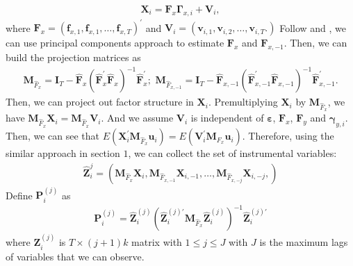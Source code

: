 \documentclass[12pt,a4paper,hyperref]{article}
\begin{document}
\begin{align}
\boldsymbol{X}_{i}=\boldsymbol{F}_{x}\boldsymbol{\Gamma}_{x,i}+\boldsymbol{V}_{i},
\end{align}
where $\boldsymbol{F}_{x}=\left( \boldsymbol{f}_{x,1}, \boldsymbol{f}_{x,1},\ldots,\boldsymbol{f}_{x,T} \right)^{'}$ and $\boldsymbol{V}_{i}=\left( \boldsymbol{v}_{i,1}, \boldsymbol{v}_{i,2},\ldots,\boldsymbol{v}_{i,T}.  \right)$
Follow \citet{bai:2003} and \citet{bai:2009}, we can use principal components approach to estimate $\boldsymbol{F}_{x}$ and $\boldsymbol{F}_{x,-1}$. Then, we can build the projection matrices as
\begin{align}
\boldsymbol{M}_{\hat{F}_{x}}=\boldsymbol{I}_{T}-\hat{\boldsymbol{F}}_{x}\left(\hat{\boldsymbol{F}}^{'}_{x} \hat{\boldsymbol{F}}_{x}   \right)^{-1}\hat{\boldsymbol{F}}^{'}_{x}; \,\, \boldsymbol{M}_{\hat{F}_{x,-1}}=\boldsymbol{I}_{T}-\hat{\boldsymbol{F}}_{x,-1}\left(\hat{\boldsymbol{F}}^{'}_{x,-1} \hat{\boldsymbol{F}}_{x,-1}   \right)^{-1}\hat{\boldsymbol{F}}^{'}_{x,-1}.
\end{align}
Then, we can project out factor structure in $\boldsymbol{X}_{i}$.  Premultiplying $\boldsymbol{X}_{i}$ by $\boldsymbol{M}_{\hat{F}_{x}}$, we have $\boldsymbol{M}_{\hat{F}_{x}}\boldsymbol{X}_{i}=\boldsymbol{M}_{\hat{F}_{x}}\boldsymbol{V}_{i}.$ And we assume $\boldsymbol{V}_{i}$ is independent of $\boldsymbol{\varepsilon}$, $\boldsymbol{F}_{x}$, $\boldsymbol{F}_{y}$ and $\boldsymbol{\gamma}_{y,i}$. Then, we can see that $E\left(\boldsymbol{X}^{'}_{i}\boldsymbol{M}_{\hat{F}_{x}}\boldsymbol{u}_{i} \right)=E\left(  \boldsymbol{V}_{i}^{'}\boldsymbol{M}_{F_{x}}\boldsymbol{u}_{i} \right).$
Therefore, using the similar approach in section $1$, we can collect the set of instrumental variables:
\begin{align}
\hat{\boldsymbol{Z}}^{j}_{i}=\left( \boldsymbol{M}_{\hat{F}_{x}}\boldsymbol{X}_{i}, \boldsymbol{M}_{\hat{F}_{x,-1}}\boldsymbol{X}_{i,-1},\ldots  ,\boldsymbol{M}_{\hat{F}_{x,-j}}\boldsymbol{X}_{i,-j}, \right)
\end{align}
Define $\boldsymbol{P}^{(j)}_{i}$ as
\begin{align}
\boldsymbol{P}^{(j)}_{i}=\hat{\boldsymbol{Z}}^{(j)}_{i} \left(\hat{\boldsymbol{Z}}^{(j)'}_{i}\boldsymbol{M}_{\hat{F}_{x}}\hat{\boldsymbol{Z}}^{(j)}_{i} \right)^{-1}\hat{\boldsymbol{Z}}^{(j)'}_{i}
\end{align}
where $\boldsymbol{Z}^{(j)}_{i}$ is $T \times  (j+1)k$ matrix with $1\leq j \leq J$ with $J$ is the maximum lags of variables that we can observe.
\end{document}
